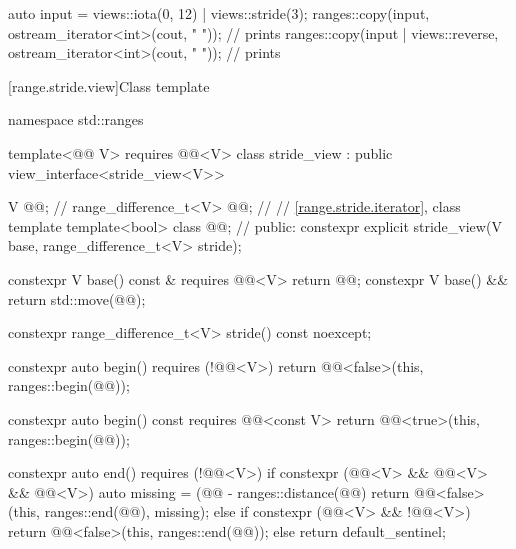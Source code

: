 \pnum
\begin{example}
\begin{codeblock}
auto input = views::iota(0, 12) | views::stride(3);
ranges::copy(input, ostream_iterator<int>(cout, " "));                  // prints 
ranges::copy(input | views::reverse, ostream_iterator<int>(cout, " ")); // prints 
\end{codeblock}
\end{example}

[range.stride.view]{Class template }

%
\begin{codeblock}
namespace std::ranges {
  template<@@ V>
    requires @@<V>
  class stride_view : public view_interface<stride_view<V>> {
    V @@;                                    // \expos
    range_difference_t<V> @@;              // \expos
    // \ref{range.stride.iterator}, class template 
    template<bool> class @@;              // \expos
  public:
    constexpr explicit stride_view(V base, range_difference_t<V> stride);

    constexpr V base() const & requires @@<V> { return @@; }
    constexpr V base() && { return std::move(@@); }

    constexpr range_difference_t<V> stride() const noexcept;

    constexpr auto begin() requires (!@@<V>) {
      return @@<false>(this, ranges::begin(@@));
    }

    constexpr auto begin() const requires @@<const V> {
      return @@<true>(this, ranges::begin(@@));
    }

    constexpr auto end() requires (!@@<V>) {
      if constexpr (@@<V> && @@<V> && @@<V>) {
        auto missing = (@@ - ranges::distance(@@) %
        return @@<false>(this, ranges::end(@@), missing);
      } else if constexpr (@@<V> && !@@<V>) {
        return @@<false>(this, ranges::end(@@));
      } else {
        return default_sentinel;
      }
    }

}}
\end{codeblock}
